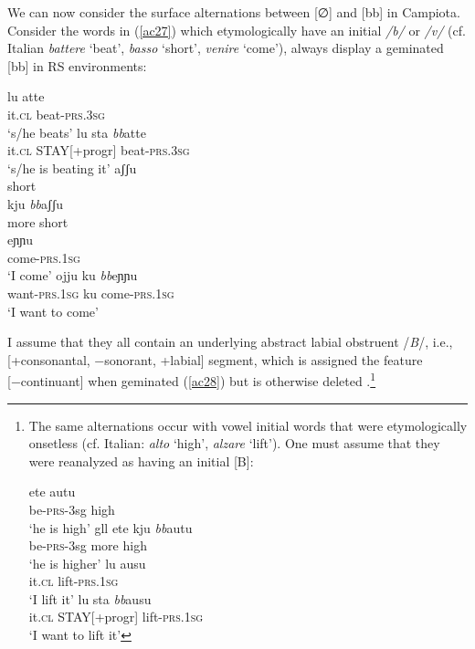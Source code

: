 \documentclass[output=paper]{langscibook}
\begin{document}
We can now consider the surface alternations between [∅] and [bb] in Campiota.  Consider the words in (\ref{ac27}) which etymologically have an initial \textit{/b/} or \textit{/v/} (cf. Italian \textit{battere} ‘beat’, \textit{basso} ‘short’, \textit{venire} ‘come’), always display a geminated [bb] in RS environments:

\ea\label{ac27}
    \ea\label{ac27a}
        \ea \label{ac27ai}\gll lu atte\\
            it.\textsc{cl} beat-\textsc{prs}.\textsc{3sg}\\
            \glt `s/he beats'
        \ex \label{ac27aii}\gll lu   sta     \textit{bb}atte\\
            it.\textsc{cl} STAY[+progr] beat-\textsc{prs}.\textsc{3sg}\\
            \glt `s/he is beating it'
        \z
    \ex\label{ac27b}
        \ea \label{ac27bi}\gll aʃʃu\\
                short\\
        \ex \label{ac27bii}\gll kju     \textit{bb}aʃʃu\\
                more    short\\
        \z
    \ex\label{ac27c}
        \ea \label{ac27ci}\gll eɲɲu\\
            come-\textsc{prs}.\textsc{1sg}\\
            \glt `I come'
        \ex \label{ac27cii}\gll ojju      ku   \textit{bb}eɲɲu\\
            want-\textsc{prs}.\textsc{1sg} ku   come-\textsc{prs}.\textsc{1sg}\\
            \glt `I want to come'
        \z
    \z
\z

I assume that they all contain an underlying abstract labial obstruent /\textit{B}/, i.e., [+consonantal, −sonorant, +labial] segment, which is assigned the feature [−continuant] when geminated (\ref{ac28}) but is otherwise deleted .\footnote{The same alternations occur with vowel initial words that were etymologically onsetless (cf. Italian: \textit{alto} `high', \textit{alzare} `lift').  One must assume that they were reanalyzed as having an initial [B]:

\ea \label{fn14ex}
    \ea \label{fn14exa}
        \ea \label{fn14exai}\gll ete autu\\
            be-\textsc{prs}-3sg high\\
            \glt ‘he is high’
        \ex \label{fn14exaii}gll ete kju \textit{bb}autu\\
            be-\textsc{prs}-3sg more high\\
            \glt ‘he is higher’
        \z
    \ex \label{fn14exb}
        \ea \label{fn14exbi}\gll lu ausu\\
            it.\textsc{cl} lift-\textsc{prs}.\textsc{1sg}\\
            \glt ‘I lift it’
        \ex \label{fn14exbii}\gll lu sta \textit{bb}ausu\\
            it.\textsc{cl} STAY[+progr]  lift-\textsc{prs}.\textsc{1sg}\\
            \glt ‘I want to lift it’
        \z
    \z
\z

}
\end{document}
